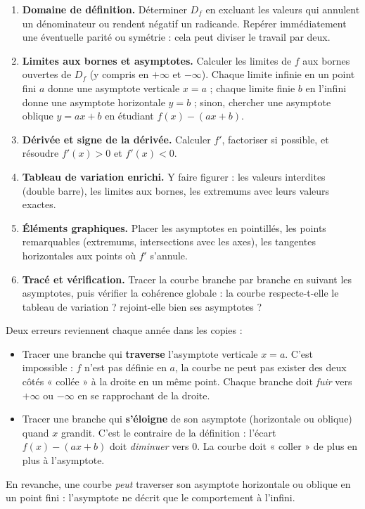 \documentclass[11pt]{article}
\newcommand{\cle}[1]{{\popxbold\color{popdark}#1}}
\begin{document}
\begin{methode}
\begin{enumerate}
\item \textbf{Domaine de définition.} Déterminer $D_f$ en excluant les valeurs qui annulent un dénominateur ou rendent négatif un radicande. Repérer immédiatement une éventuelle \cle{parité} ou \cle{symétrie} : cela peut diviser le travail par deux.
\item \textbf{Limites aux bornes et asymptotes.} Calculer les limites de $f$ aux bornes ouvertes de $D_f$ (y compris en $+\infty$ et $-\infty$). Chaque limite infinie en un point fini $a$ donne une \cle{asymptote verticale} $x = a$ ; chaque limite finie $b$ en l'infini donne une \cle{asymptote horizontale} $y = b$ ; sinon, chercher une \cle{asymptote oblique} $y = ax+b$ en étudiant $f(x) - (ax+b)$.
\item \textbf{Dérivée et signe de la dérivée.} Calculer $f'$, factoriser si possible, et résoudre $f'(x) > 0$ et $f'(x) < 0$.
\item \textbf{Tableau de variation enrichi.} Y faire figurer : les valeurs interdites (double barre), les limites aux bornes, les extremums avec leurs valeurs exactes.
\item \textbf{Éléments graphiques.} Placer les asymptotes en pointillés, les points remarquables (extremums, intersections avec les axes), les tangentes horizontales aux points où $f'$ s'annule.
\item \textbf{Tracé et vérification.} Tracer la courbe branche par branche en suivant les asymptotes, puis vérifier la cohérence globale : la courbe respecte-t-elle le tableau de variation ? rejoint-elle bien ses asymptotes ?
\end{enumerate}
\end{methode}

\begin{attention}
Deux erreurs reviennent chaque année dans les copies :
\begin{itemize}
\item Tracer une branche qui \textbf{traverse} l'asymptote verticale $x = a$. C'est impossible : $f$ n'est pas définie en $a$, la courbe ne peut pas exister des deux côtés « collée » à la droite en un même point. Chaque branche doit \emph{fuir} vers $+\infty$ ou $-\infty$ en se rapprochant de la droite.
\item Tracer une branche qui \textbf{s'éloigne} de son asymptote (horizontale ou oblique) quand $x$ grandit. C'est le contraire de la définition : l'écart $f(x) - (ax+b)$ doit \emph{diminuer} vers $0$. La courbe doit « coller » de plus en plus à l'asymptote.
\end{itemize}
En revanche, une courbe \emph{peut} traverser son asymptote horizontale ou oblique en un point fini : l'asymptote ne décrit que le comportement à l'infini.
\end{attention}
\end{document}
